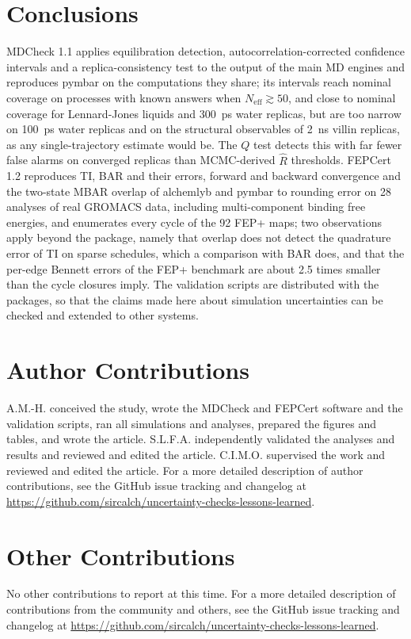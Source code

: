 \documentclass[9pt,lessons]{livecoms}
\newcommand{\githubrepository}{\url{https://github.com/sircalch/uncertainty-checks-lessons-learned}}
\begin{document}
\section{Conclusions}
MDCheck 1.1 applies equilibration detection, autocorrelation-corrected confidence intervals and a replica-consistency test to the output of the main MD engines and reproduces pymbar on the computations they share; its intervals reach nominal coverage on processes with known answers when $N_{\mathrm{eff}} \gtrsim 50$, and close to nominal coverage for Lennard-Jones liquids and 300~ps water replicas, but are too narrow on 100~ps water replicas and on the structural observables of 2~ns villin replicas, as any single-trajectory estimate would be. The $Q$ test detects this with far fewer false alarms on converged replicas than MCMC-derived $\hat{R}$ thresholds. FEPCert 1.2 reproduces TI, BAR and their errors, forward and backward convergence and the two-state MBAR overlap of alchemlyb and pymbar to rounding error on 28 analyses of real GROMACS data, including multi-component binding free energies, and enumerates every cycle of the 92 FEP+ maps; two observations apply beyond the package, namely that overlap does not detect the quadrature error of TI on sparse schedules, which a comparison with BAR does, and that the per-edge Bennett errors of the FEP+ benchmark are about 2.5 times smaller than the cycle closures imply. The validation scripts are distributed with the packages, so that the claims made here about simulation uncertainties can be checked and extended to other systems.


\section*{Author Contributions}
A.M.-H. conceived the study, wrote the MDCheck and FEPCert software and the validation scripts, ran all simulations and analyses, prepared the figures and tables, and wrote the article. S.L.F.A. independently validated the analyses and results and reviewed and edited the article. C.I.M.O. supervised the work and reviewed and edited the article. For a more detailed description of author contributions, see the GitHub issue tracking and changelog at \githubrepository.

\section*{Other Contributions}
No other contributions to report at this time. For a more detailed description of contributions from the community and others, see the GitHub issue tracking and changelog at \githubrepository.
\end{document}
